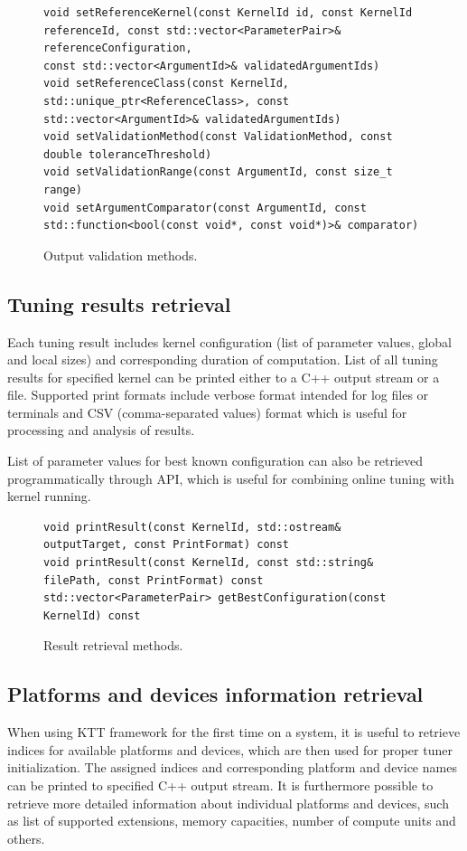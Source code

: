 \documentclass
[
    digital, %
    oneside, %
    table, %
    nolof, %
    nolot, %
    nocover %
]{fithesis3}
\begin{document}
\begin{figure}
\begin{lstlisting}
void setReferenceKernel(const KernelId id, const KernelId referenceId, const std::vector<ParameterPair>& referenceConfiguration,
const std::vector<ArgumentId>& validatedArgumentIds)
void setReferenceClass(const KernelId, std::unique_ptr<ReferenceClass>, const std::vector<ArgumentId>& validatedArgumentIds)
void setValidationMethod(const ValidationMethod, const double toleranceThreshold)
void setValidationRange(const ArgumentId, const size_t range)
void setArgumentComparator(const ArgumentId, const std::function<bool(const void*, const void*)>& comparator)
\end{lstlisting}
\caption{Output validation methods.}
\label{ktt-validation-methods}
\end{figure}

\subsection{Tuning results retrieval}
Each tuning result includes kernel configuration (list of parameter values, global and local sizes) and corresponding duration of computation. List of
all tuning results for specified kernel can be printed either to a C++ output stream or a file. Supported print formats include verbose format intended
for log files or terminals and CSV (comma-separated values) format which is useful for processing and analysis of results.

List of parameter values for best known configuration can also be retrieved programmatically through API, which is useful for combining online tuning
with kernel running.

\begin{figure}
\begin{lstlisting}
void printResult(const KernelId, std::ostream& outputTarget, const PrintFormat) const
void printResult(const KernelId, const std::string& filePath, const PrintFormat) const
std::vector<ParameterPair> getBestConfiguration(const KernelId) const
\end{lstlisting}
\caption{Result retrieval methods.}
\label{ktt-result-methods}
\end{figure}

\subsection{Platforms and devices information retrieval}
When using KTT framework for the first time on a system, it is useful to retrieve indices for available platforms and devices, which are then used for
proper tuner initialization. The assigned indices and corresponding platform and device names can be printed to specified C++ output stream. It is
furthermore possible to retrieve more detailed information about individual platforms and devices, such as list of supported extensions, memory
capacities, number of compute units and others.
\end{document}
